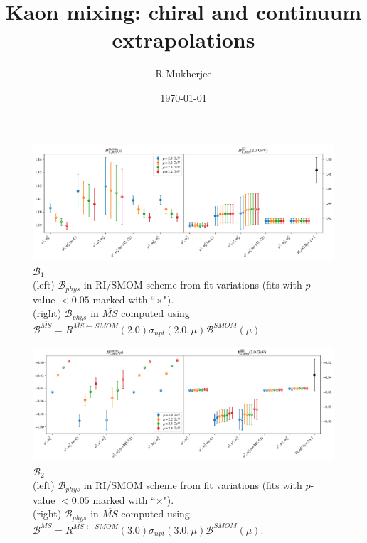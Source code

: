 \documentclass[12pt]{extarticle}
\title{Kaon mixing: chiral and continuum extrapolations}
\author{R Mukherjee}
\date{\today}
\begin{document}
\maketitle
\tableofcontents
\clearpage
\begin{figure}
\centering
\includegraphics[page=1, width=1.1\textwidth]{VVpAA/SUSY/fit_summary.pdf}
\caption{$\mathcal{B}_{1}$\\(left) $\mathcal{B}_{phys}$ in RI/SMOM scheme from fit variations (fits with $p$-value $<0.05$ marked with ``$\times$"). \\(right) $\mathcal{B}_{phys}$ in $\overline{MS}$ computed using $\mathcal{B}^{\overline{MS}} = R^{\overline{MS}\leftarrow SMOM}(2.0)\sigma_{npt}(2.0,\mu) \mathcal{B}^{SMOM}(\mu)$.}
\end{figure}
\clearpage
\begin{figure}
\centering
\includegraphics[page=1, width=1.1\textwidth]{VVmAA/SUSY/fit_summary.pdf}
\caption{$\mathcal{B}_{2}$\\(left) $\mathcal{B}_{phys}$ in RI/SMOM scheme from fit variations (fits with $p$-value $<0.05$ marked with ``$\times$"). \\(right) $\mathcal{B}_{phys}$ in $\overline{MS}$ computed using $\mathcal{B}^{\overline{MS}} = R^{\overline{MS}\leftarrow SMOM}(3.0)\sigma_{npt}(3.0,\mu) \mathcal{B}^{SMOM}(\mu)$.}
\end{figure}
\clearpage
\end{document}
